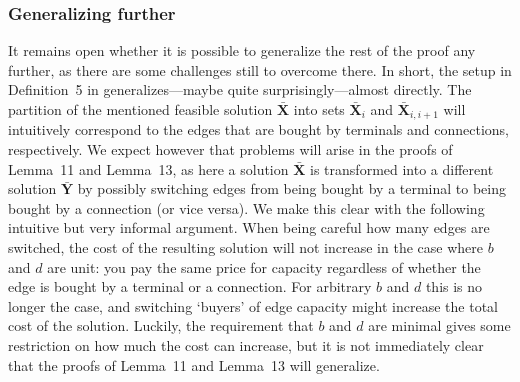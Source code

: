 \subsubsection{Generalizing further}
It remains open whether it is possible to generalize the rest of the proof any further, as there are some challenges still to overcome there.
In short, the setup in Definition~5 in \cite{bosman2017exploring} generalizes---maybe quite surprisingly---almost directly.
The partition of the mentioned feasible solution $\bar{\boldsymbol X}$ into sets $\bar{\boldsymbol X}_i$ and $\bar{\boldsymbol X}_{i,i+1}$ will intuitively correspond to the edges that are bought by terminals and connections, respectively.
We expect however that problems will arise in the proofs of Lemma~11 and Lemma~13, as here a solution $\bar{\boldsymbol X}$ is transformed into a different solution $\bar{\boldsymbol Y}$ by possibly switching edges from being bought by a terminal to being bought by a connection (or vice versa).
We make this clear with the following intuitive but very informal argument.
When being careful how many edges are switched, the cost of the resulting solution will not increase in the case where $b$ and $d$ are unit: you pay the same price for capacity regardless of whether the edge is bought by a terminal or a connection.
For arbitrary $b$ and $d$ this is no longer the case, and switching `buyers' of edge capacity might increase the total cost of the solution.
Luckily, the requirement that $b$ and $d$ are minimal gives some restriction on how much the cost can increase, but it is not immediately clear that the proofs of Lemma~11 and Lemma~13 will generalize.
